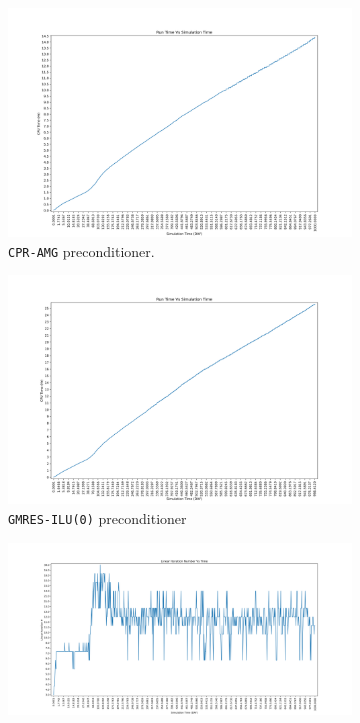 \begin{figure}
\centering
\begin{subfigure}{.5\textwidth}
  \centering
  \includegraphics[width=1.1\linewidth]{figures/case8/cpr/cpu_time.png_reduced.png}
  \caption{\texttt{CPR-AMG} preconditioner.}
	\label{case8_cpu_cpr}
\end{subfigure}%
\begin{subfigure}{.5\textwidth}
  \centering
  \includegraphics[width=1.1\linewidth]{figures/case8/ilu/cpu_time.png_reduced.png}
  \caption{\texttt{GMRES-ILU(0)} preconditioner}
	\label{case8_cpu_ilu}
\end{subfigure}
\begin{subfigure}{.5\textwidth}
  \centering
  \includegraphics[width=1.1\linewidth]{figures/case8/cpr/its_time.png_reduced.png}

\end{subfigure}
\end{figure}
